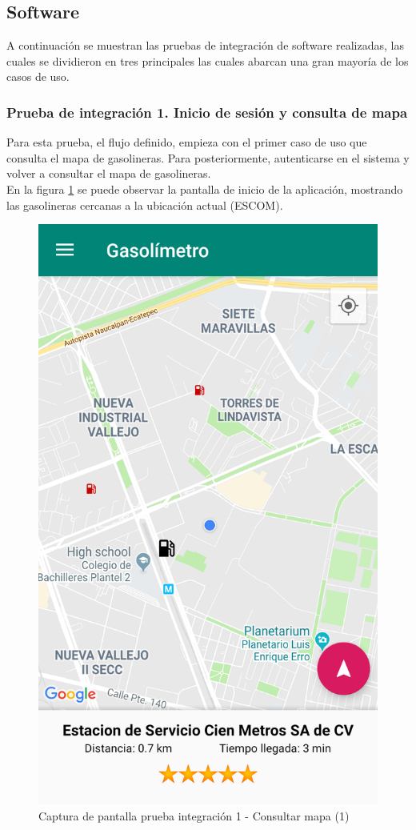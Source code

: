 \subsection{Software}
A continuación se muestran las pruebas de integración de software realizadas, las cuales se dividieron en tres principales las cuales abarcan una gran mayoría de los casos de uso.
\subsubsection{Prueba de integración 1. Inicio de sesión y consulta de mapa}
Para esta prueba, el flujo definido, empieza con el primer caso de uso que consulta el mapa de gasolineras. Para posteriormente, autenticarse en el sistema y volver a consultar el mapa de gasolineras.\\
En la figura \ref{fig:int1} se puede observar la pantalla de inicio de la aplicación, mostrando las gasolineras cercanas a la ubicación actual (ESCOM).

\begin{figure}[H]
	\centering
	\includegraphics[scale=.2]{DocumentoTecnico/Capitulo6/integracion/Software/images/1.png}
	\caption{Captura de pantalla prueba integración 1 - Consultar mapa (1)}
	\label{fig:int1}
\end{figure}

